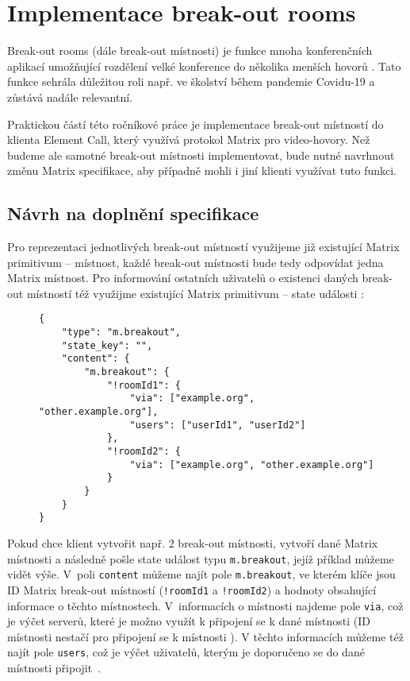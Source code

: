 \section{Implementace break-out rooms}\label{breakoutRooms}

Break-out rooms (dále break-out místnosti) je funkce mnoha konferenčních
aplikací umožňující rozdělení velké konference do několika menších hovorů
\parencite{Zoom-EnablingMeetingBreakoutRooms,Microsoft-UseBreakoutRoomsInMSTeamsMeetings}.
Tato funkce sehrála důležitou roli např. ve školství během pandemie Covidu-19
\parencite{AhmedKhalid-TheImpactOfUtilizingBreakoutRooms,Agustina-ZoomBreakoutRoomsForStudents}
a zůstává nadále relevantní.

Praktickou částí této ročníkové práce je implementace break-out místností do
klienta Element Call, který využívá protokol Matrix pro video-hovory. Než budeme
ale samotné break-out místnosti implementovat, bude nutné navrhnout změnu Matrix
specifikace, aby případně mohli i jiní klienti využívat tuto funkci.

\subsection{Návrh na doplnění specifikace}\label{breakoutRoomsMSC}

Pro reprezentaci jednotlivých break-out místností využijeme již existující
Matrix primitivum -- místnost, každé break-out místnosti bude tedy odpovídat
jedna Matrix místnost. Pro informování ostatních uživatelů o existenci daných
break-out místností též využijme existující Matrix primitivum -- state události
\parencite{GitHub-MSC3985}:

\begin{figure}[H]
    \begin{verbatim}
{
	"type": "m.breakout",
	"state_key": "",
	"content": {
		"m.breakout": {
			"!roomId1": {
				"via": ["example.org", "other.example.org"],
				"users": ["userId1", "userId2"]
			},
			"!roomId2": {
				"via": ["example.org", "other.example.org"]
			}
		}
	}
}
	\end{verbatim}
\end{figure}

Pokud chce klient vytvořit např. 2 break-out místnosti, vytvoří dané Matrix
místnosti a následně pošle state událost typu \texttt{m.breakout},
jejíž příklad můžeme vidět výše. V~poli \texttt{content} můžeme najít
pole \texttt{m.breakout}, ve kterém klíče jsou ID Matrix break-out
místností (\texttt{!roomId1} a \texttt{!roomId2}) a hodnoty
obsahující informace o těchto místnostech. V~informacích o místnosti najdeme
pole \texttt{via}, což je výčet serverů, které je možno využít k
připojení se k dané místnosti (ID místnosti nestačí pro připojení se k místnosti
\parencite{MatrixORG-Spec}). V těchto informacích můžeme též najít pole
\texttt{users}, což je výčet uživatelů, kterým je doporučeno se do
dané místnosti připojit~\parencite{GitHub-MSC3985}.


